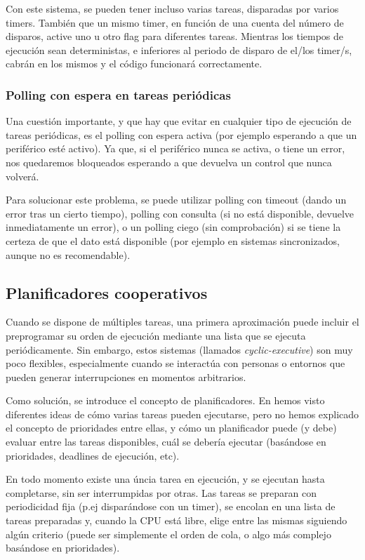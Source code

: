 \documentclass[../main.tex]{subfiles}
\begin{document}
            Con este sistema, se pueden tener incluso varias tareas, disparadas por varios timers. También que un mismo timer, en función de una cuenta del número de disparos, active uno u otro flag para diferentes tareas. Mientras los tiempos de ejecución sean deterministas, e inferiores al periodo de disparo de el/los timer/s, cabrán en los mismos y el código funcionará correctamente.

        \subsubsection{Polling con espera en tareas periódicas}

            Una cuestión importante, y que hay que evitar en cualquier tipo de ejecución de tareas periódicas, es el polling con espera activa (por ejemplo esperando a que un periférico esté activo). Ya que, si el periférico nunca se activa, o tiene un error, nos quedaremos bloqueados esperando a que devuelva un control que nunca volverá.

            Para solucionar este problema, se puede utilizar polling con timeout (dando un error tras un cierto tiempo), polling con consulta (si no está disponible, devuelve inmediatamente un error), o un polling ciego (sin comprobación) si se tiene la certeza de que el dato está disponible (por ejemplo en sistemas sincronizados, aunque no es recomendable).


    \subsection{Planificadores cooperativos}

        Cuando se dispone de múltiples tareas, una primera aproximación puede incluir el preprogramar su orden de ejecución mediante una lista que se ejecuta periódicamente. Sin embargo, estos sistemas (llamados \emph{cyclic-executive}) son muy poco flexibles, especialmente cuando se interactúa con personas o entornos que pueden generar interrupciones en momentos arbitrarios. 

        Como solución, se introduce el concepto de planificadores. En  hemos visto diferentes ideas de cómo varias tareas pueden ejecutarse, pero no hemos explicado el concepto de prioridades entre ellas, y cómo un planificador puede (y debe) evaluar entre las tareas disponibles, cuál se debería ejecutar (basándose en prioridades, deadlines de ejecución, etc).


        En todo momento existe una úncia tarea en ejecución, y se ejecutan hasta completarse, sin ser interrumpidas por otras. Las tareas se preparan con periodicidad fija (p.ej disparándose con un timer), se encolan en una lista de tareas preparadas y, cuando la CPU está libre, elige entre las mismas siguiendo algún criterio (puede ser simplemente el orden de cola, o algo más complejo basándose en prioridades).
\end{document}
